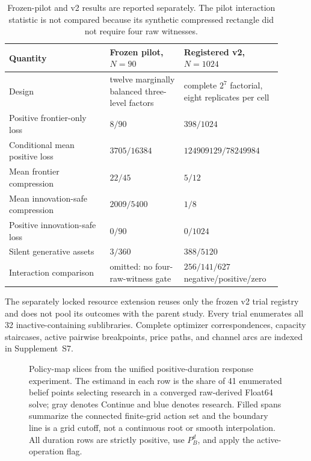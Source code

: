 \begin{table}[htbp]
\centering
\scriptsize
\begin{tabular}{@{}
  p{0.34\linewidth}
  >{\centering\arraybackslash}p{0.25\linewidth}
  >{\centering\arraybackslash}p{0.31\linewidth}@{}}
\toprule
Quantity & Frozen pilot, \(N=90\) & Registered v2, \(N=1024\)\\
\midrule
Design & twelve marginally balanced three-level factors &
complete \(2^7\) factorial, eight replicates per cell\\
Positive frontier-only loss & \(8/90\) & \(398/1024\)\\
Conditional mean positive loss & \(3705/16384\) &
\(124909129/78249984\)\\
Mean frontier compression & \(22/45\) & \(5/12\)\\
Mean innovation-safe compression & \(2009/5400\) & \(1/8\)\\
Positive innovation-safe loss & \(0/90\) & \(0/1024\)\\
Silent generative assets & \(3/360\) & \(388/5120\)\\
Interaction comparison & omitted: no four-raw-witness gate &
\(256/141/627\) negative/positive/zero\\
\bottomrule
\end{tabular}
\caption{Frozen-pilot and v2 results are reported separately.  The pilot
interaction statistic is not compared because its synthetic compressed
rectangle did not require four raw witnesses.}
\label{tab:supp-randomized-pilot-comparison}
\end{table}

The separately locked resource extension reuses only the frozen v2 trial
registry and does not pool its outcomes with the parent study.  Every trial
enumerates all 32 inactive-containing sublibraries.  Complete optimizer
correspondences, capacity staircases, active pairwise breakpoints, price paths,
and channel arcs are indexed in Supplement~S7.

\begin{figure}[htbp]
  \centering
  
  \caption{Policy-map slices from the unified positive-duration response
  experiment.  The estimand in each row is the share of 41 enumerated belief
  points selecting research in a converged raw-derived Float64 solve; gray
  denotes Continue and blue denotes research.  Filled spans summarize the
  connected finite-grid action set and the boundary line is a grid cutoff,
  not a continuous root or smooth interpolation.  All duration rows are
  strictly positive, use \(P_B^d\), and apply the active-operation flag.}
  \label{fig:supp-dynamic-research-policy-regions}
\end{figure}

\clearpage
